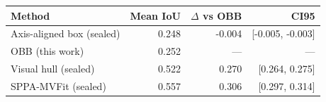\begin{tabular}{@{}lrrr@{}}
\toprule
Method & Mean IoU & $\Delta$ vs OBB & CI95 \\
\midrule
Axis-aligned box (sealed) & 0.248 & -0.004 & [-0.005, -0.003] \\
OBB (this work) & 0.252 & --- & --- \\
Visual hull (sealed) & 0.522 & 0.270 & [0.264, 0.275] \\
SPPA-MVFit (sealed) & 0.557 & 0.306 & [0.297, 0.314] \\
\bottomrule
\end{tabular}

